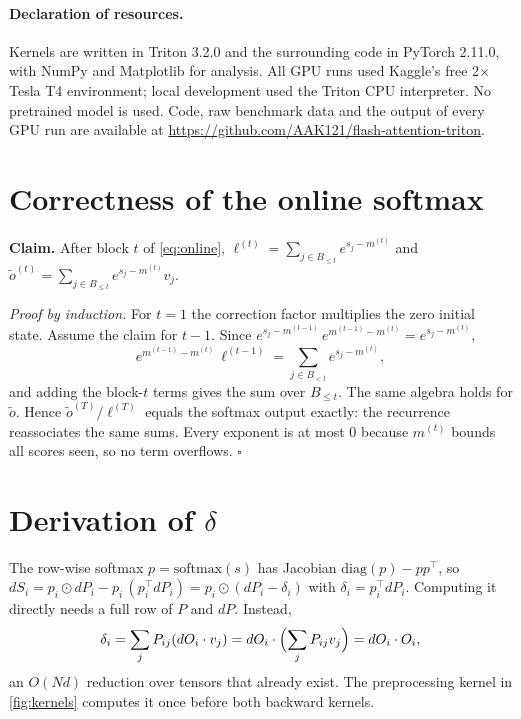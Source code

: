 \documentclass[10pt,twocolumn,letterpaper]{article}
\begin{document}
\paragraph{Declaration of resources.}
Kernels are written in Triton 3.2.0 and the surrounding code in PyTorch
2.11.0, with NumPy and Matplotlib for analysis. All GPU runs used Kaggle's
free 2$\times$ Tesla T4 environment; local development used the Triton CPU
interpreter. No pretrained model is used. Code, raw benchmark data and the
output of every GPU run are available at
\url{https://github.com/AAK121/flash-attention-triton}.

{
    \small
    
    
}

\clearpage
\setcounter{page}{1}
\maketitlesupplementary
\appendix

\section{Correctness of the online softmax}
\label{sec:proof}

\textbf{Claim.} After block $t$ of \cref{eq:online},
$\ell^{(t)} = \sum_{j \in B_{\le t}} e^{s_j - m^{(t)}}$ and
$\tilde{o}^{(t)} = \sum_{j \in B_{\le t}} e^{s_j - m^{(t)}} v_j$.

\textit{Proof by induction.} For $t = 1$ the correction factor multiplies the
zero initial state. Assume the claim for $t-1$. Since
$e^{s_j - m^{(t-1)}}\, e^{m^{(t-1)} - m^{(t)}} = e^{s_j - m^{(t)}}$,
\[
e^{m^{(t-1)} - m^{(t)}}\, \ell^{(t-1)} = \sum_{j \in B_{<t}} e^{s_j - m^{(t)}},
\]
and adding the block-$t$ terms gives the sum over $B_{\le t}$. The same algebra
holds for $\tilde{o}$. Hence $\tilde{o}^{(T)} / \ell^{(T)}$ equals the softmax
output exactly: the recurrence reassociates the same sums. Every exponent is
at most 0 because $m^{(t)}$ bounds all scores seen, so no term overflows.
$\square$

\section{Derivation of $\delta$}
\label{sec:delta}

The row-wise softmax $p = \mathrm{softmax}(s)$ has Jacobian
$\mathrm{diag}(p) - p p^\top$, so
$dS_i = p_i \odot dP_i - p_i\, (p_i^\top dP_i) = p_i \odot (dP_i - \delta_i)$
with $\delta_i = p_i^\top dP_i$. Computing it directly needs a full row of
$P$ and $dP$. Instead,
\[
\delta_i = \sum_j P_{ij} (dO_i \cdot v_j)
= dO_i \cdot \Bigl(\sum_j P_{ij} v_j\Bigr) = dO_i \cdot O_i,
\]
an $O(Nd)$ reduction over tensors that already exist. The preprocessing
kernel in \cref{fig:kernels} computes it once before both backward kernels.
\end{document}
